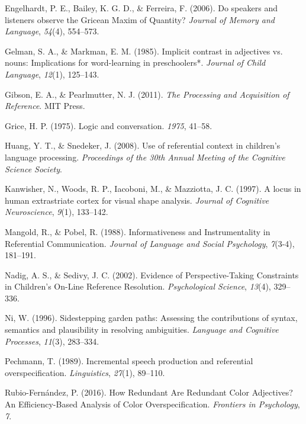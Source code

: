 \documentclass[10pt, letterpaper]{article}
\begin{document}
\hypertarget{ref-engelhardt_speakers_2006}{}
Engelhardt, P. E., Bailey, K. G. D., \& Ferreira, F. (2006). Do speakers
and listeners observe the Gricean Maxim of Quantity? \emph{Journal of
Memory and Language}, \emph{54}(4), 554--573.

\hypertarget{ref-gelman_implicit_1985}{}
Gelman, S. A., \& Markman, E. M. (1985). Implicit contrast in adjectives
vs. nouns: Implications for word-learning in preschoolers*.
\emph{Journal of Child Language}, \emph{12}(1), 125--143.

\hypertarget{ref-gibson_processing_2011}{}
Gibson, E. A., \& Pearlmutter, N. J. (2011). \emph{The Processing and
Acquisition of Reference}. MIT Press.

\hypertarget{ref-grice1975logic}{}
Grice, H. P. (1975). Logic and conversation. \emph{1975}, 41--58.

\hypertarget{ref-huangsnedeker2008}{}
Huang, Y. T., \& Snedeker, J. (2008). Use of referential context in
children's language processing. \emph{Proceedings of the 30th Annual
Meeting of the Cognitive Science Society}.

\hypertarget{ref-kanwisher}{}
Kanwisher, N., Woods, R. P., Iacoboni, M., \& Mazziotta, J. C. (1997). A
locus in human extrastriate cortex for visual shape analysis.
\emph{Journal of Cognitive Neuroscience}, \emph{9}(1), 133--142.

\hypertarget{ref-mangold_informativeness_1988}{}
Mangold, R., \& Pobel, R. (1988). Informativeness and Instrumentality in
Referential Communication. \emph{Journal of Language and Social
Psychology}, \emph{7}(3-4), 181--191.

\hypertarget{ref-nadig_evidence_2002}{}
Nadig, A. S., \& Sedivy, J. C. (2002). Evidence of Perspective-Taking
Constraints in Children's On-Line Reference Resolution.
\emph{Psychological Science}, \emph{13}(4), 329--336.

\hypertarget{ref-nietal}{}
Ni, W. (1996). Sidestepping garden paths: Assessing the contributions of
syntax, semantics and plausibility in resolving ambiguities.
\emph{Language and Cognitive Processes}, \emph{11}(3), 283--334.

\hypertarget{ref-pechmann_incremental_1989}{}
Pechmann, T. (1989). Incremental speech production and referential
overspecification. \emph{Linguistics}, \emph{27}(1), 89--110.

\hypertarget{ref-rubio-fernandez_how_2016}{}
Rubio-Fernández, P. (2016). How Redundant Are Redundant Color
Adjectives? An Efficiency-Based Analysis of Color Overspecification.
\emph{Frontiers in Psychology}, \emph{7}.
\end{document}
